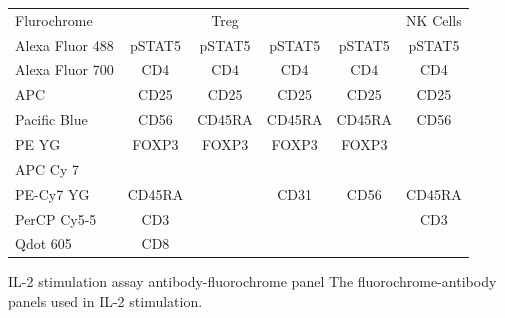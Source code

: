 

\begin{table}[h!]\footnotesize
  \centering
\begin{tabularx}{\textwidth}{lccccc}
\rowcolor{Gray}
Flurochrome     &        & Treg   &        &        & NK Cells\\
Alexa Fluor 488 & pSTAT5 & pSTAT5 & pSTAT5 & pSTAT5 & pSTAT5\\
Alexa Fluor 700 & CD4    & CD4    & CD4    & CD4    & CD4\\
APC             & CD25   & CD25   & CD25   & CD25   & CD25\\
Pacific Blue    & CD56   & CD45RA & CD45RA & CD45RA & CD56\\
PE YG           & FOXP3  & FOXP3  & FOXP3  & FOXP3  & \\
APC Cy 7        &        &        &        &        & \\
PE-Cy7 YG       & CD45RA &        & CD31   & CD56   & CD45RA\\
PerCP Cy5-5     & CD3    &        &        &        & CD3\\
Qdot 605        & CD8    &        &        &        & \\
\end{tabularx}
{IL-2 stimulation assay antibody-fluorochrome panel}
{
The fluorochrome-antibody panels used in IL-2 stimulation.
}
\end{table}



